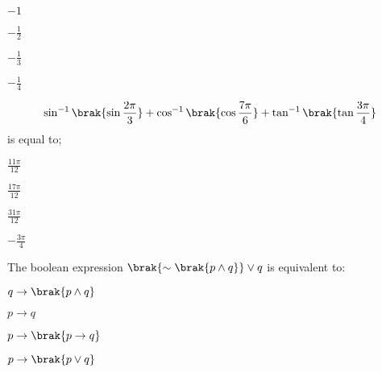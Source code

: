    \hfill{}
    
    \begin{enumerate}
    \begin{multicols}{4}
        \item $-1$
        \item $-\frac{1}{2}$
        \item $-\frac{1}{3}$
        \item $-\frac{1}{4}$
    \end{multicols}
    \end{enumerate}

    \item 
    \begin{align*}
        \sin^{-1}{\brak{\sin{\frac{2\pi}{3}}}} + \cos^{-1}{\brak{\cos{\frac{7\pi}{6}}}} + \tan^{-1}{\brak{\tan{\frac{3\pi}{4}}}}
    \end{align*}
    is equal to;

    \hfill{}
    
    \begin{enumerate}
    \begin{multicols}{4}
        \item $\frac{11\pi}{12}$
        \item $\frac{17\pi}{12}$
        \item $\frac{31\pi}{12}$
        \item $-\frac{3\pi}{4}$
    \end{multicols}
    \end{enumerate}

    \item 
    The boolean expression $\brak{ \sim \brak{p \land q}} \lor q$ is equivalent to: 

    \hfill{}
    
    \begin{enumerate}
    \begin{multicols}{2}
        \item $q \to \brak{p \land q}$
        \item $p \to q$
        \item $p \to \brak{p \to q}$
        \item $p \to \brak{p \lor q}$
    \end{multicols}
    \end{enumerate}

%
